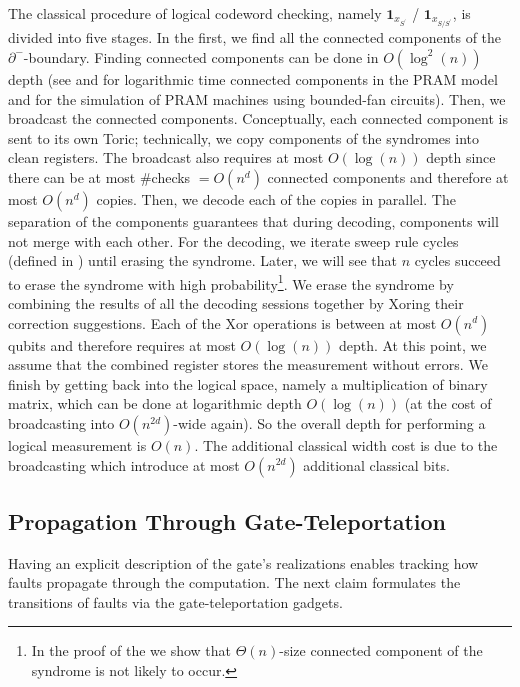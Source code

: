 The classical procedure of logical codeword checking, namely $ \mathbf{1}_{x_{S^{\prime}}}$ / $ \mathbf{1}_{x_{S/S^{\prime}}}$, is divided into five stages. In the first, we find all the connected components of the $\partial^{-}$-boundary. Finding connected components can be done in $O(\log^{2}(n))$ depth (see \cite{SHILOACH198257} and \cite{1676869} for logarithmic time connected components in the PRAM model and \cite{Lev1980} for the simulation of PRAM machines using bounded-fan circuits). Then, we broadcast the connected components. Conceptually, each connected component is sent to its own Toric; technically, we copy components of the syndromes into clean registers. The broadcast also requires at most $O(\log(n))$ depth since there can be at most \#checks $=O(n^{d})$ connected components and therefore at most $O(n^{d})$ copies. Then, we decode each of the copies in parallel. The separation of the components guarantees that during decoding, components will not merge with each other. For the decoding, we iterate sweep rule cycles (defined in ) until erasing the syndrome. Later, we will see that $n$ cycles succeed to erase the syndrome with high probability\footnote{ In the proof of the  we show that $\Theta(n)$-size connected component of the syndrome is not likely to occur.}. We erase the syndrome by combining the results of all the decoding sessions together by Xoring their correction suggestions. Each of the Xor operations is between at most $O(n^{d})$ qubits and therefore requires at most $O(\log(n))$ depth. At this point, we assume that the combined register stores the measurement without errors. We finish by getting back into the logical space, namely a multiplication of binary matrix, which can be done at logarithmic depth $O(\log(n))$ (at the cost of broadcasting into $O(n^{2d})$-wide again). So the overall depth for performing a logical measurement is $O(n)$. The additional classical width cost is due to the broadcasting which introduce at most $O(n^{2d})$ additional classical bits.


\newpage

\subsection{Propagation Through Gate-Teleportation}

Having an explicit description of the gate's realizations enables tracking how faults propagate through the computation. The next claim formulates the transitions of faults via the gate-teleportation gadgets. 

